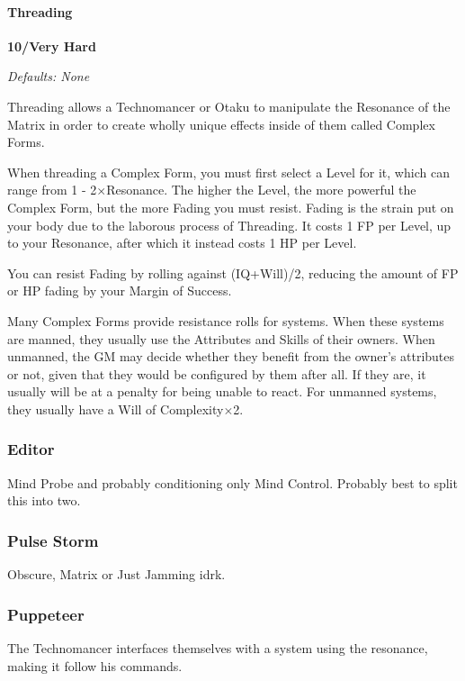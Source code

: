 \begin{multicols*}{3}
	\paragraph{Threading}
	\begin{flushright}
		\textbf{10/Very Hard}
	\end{flushright}
	\textcolor{NavyBlue}{\textit{Defaults: None}}
	
	Threading allows a Technomancer or Otaku to manipulate the Resonance of the Matrix in order to create wholly unique effects inside of them called Complex Forms.
	
	When threading a Complex Form, you must first select a Level for it, which can range from 1 - 2\(\times\)Resonance. The higher the Level, the more powerful the Complex Form, but the more Fading you must resist. Fading is the strain put on your body due to the laborous process of Threading. It costs 1 FP per Level, up to your Resonance, after which it instead costs 1 HP per Level.
	
	You can resist Fading by rolling against (IQ+Will)/2, reducing the amount of FP or HP fading by your Margin of Success.
	
	Many Complex Forms provide resistance rolls for systems. When these systems are manned, they usually use the Attributes and Skills of their owners. When unmanned, the GM may decide whether they benefit from the owner's attributes or not, given that they would be configured by them after all. If they are, it usually will be at a penalty for being unable to react. For unmanned systems, they usually have a Will of Complexity\(\times\)2.
	
	\subsubsection*{Editor}
	
	Mind Probe and probably conditioning only Mind Control. Probably best to split this into two.
	
	\subsubsection*{Pulse Storm}
	
	Obscure, Matrix or Just Jamming idrk.
	
	\subsubsection*{Puppeteer}
	
	The Technomancer interfaces themselves with a system using the resonance, making it follow his commands.
	

\end{multicols*}
